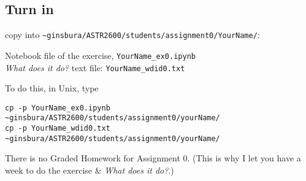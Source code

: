 \documentclass{article}
\begin{document}
\begin{spacing}{1.0}
\section{Turn in}
copy into \texttt{\textasciitilde ginsbura/ASTR2600/students/assignment0/YourName/}:
\begin{tabbing}
Notebook file of the exercise, \texttt{YourName\_ex0.ipynb} \\
\emph{What does it do?} text file: \texttt{YourName\_wdid0.txt}
\end{tabbing}

To do this, in Unix, type

\begin{tabbing}
\texttt{cp -p YourName\_ex0.ipynb \textasciitilde ginsbura/ASTR2600/students/assignment0/yourName/} \\
\texttt{cp -p YourName\_wdid0.txt \textasciitilde ginsbura/ASTR2600/students/assignment0/yourName/}
\end{tabbing}

There is no Graded Homework for Assignment 0.
(This is why I let you have a week to do the exercise \& \emph{What does it do?}.)

\end{spacing}
\end{document}
